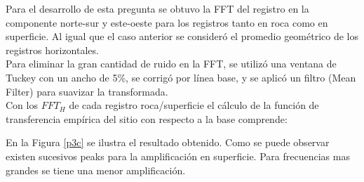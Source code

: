 Para el desarrollo de esta pregunta se obtuvo la FFT del registro en la componente norte-sur y este-oeste para los registros tanto en roca como en superficie. Al igual que el caso anterior se consideró el promedio geométrico de los registros horizontales. \\

Para eliminar la gran cantidad de ruido en la FFT, se utilizó una ventana de Tuckey con un ancho de 5\%, se corrigó por línea base, y se aplicó un filtro (Mean Filter) para suavizar la transformada. \\

Con los $FFT_H$ de cada registro roca/superficie el cálculo de la función de transferencia empírica del sitio con respecto a la base comprende:


En la Figura \ref{p3c} se ilustra el resultado obtenido. Como se puede observar existen sucesivos peaks para la amplificación en superficie. Para frecuencias mas grandes se tiene una menor amplificación.

